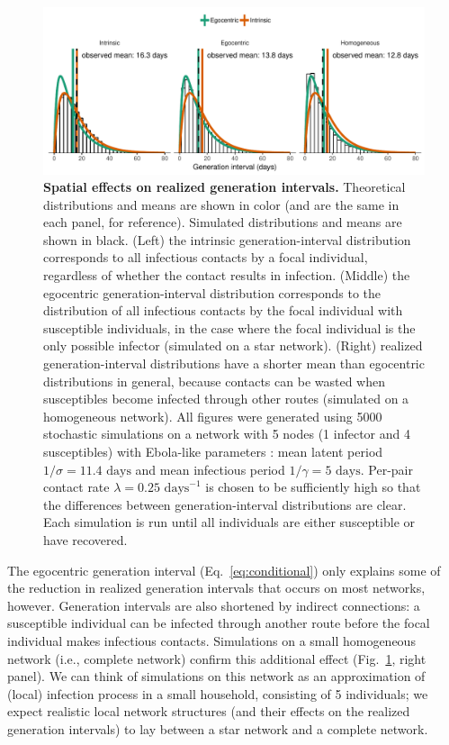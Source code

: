 \documentclass[12pt]{article}
\newcommand{\eref}[1]{Eq.~\ref{eq:#1}}
\newcommand{\fref}[1]{Fig.~\ref{fig:#1}}
\begin{document}
\begin{figure}[!ht]
\includegraphics[width=\textwidth]{../fig/local_effect.pdf}
\caption{
\textbf{Spatial effects on realized generation intervals.}
Theoretical distributions and means are shown in color (and are the same in each panel, for reference). Simulated distributions and means are shown in black.
(Left) the intrinsic generation-interval distribution corresponds to all infectious contacts by a focal individual, regardless of whether the contact results in infection.
(Middle) the egocentric generation-interval distribution corresponds to the distribution of all infectious contacts by the focal individual with susceptible individuals, in the case where the focal individual is the only possible infector (simulated on a star network).
(Right) realized generation-interval distributions have a shorter mean than egocentric distributions in general, because contacts can be wasted when susceptibles become infected through other routes (simulated on a homogeneous network).
All figures were generated using 5000 stochastic simulations on a network with 5 nodes (1 infector and 4 susceptibles) with Ebola-like parameters \citep{who2014ebola}:
mean latent period $1/\sigma = 11.4 \textrm{ days}$ and mean infectious period $1/\gamma = 5 \textrm{ days}$. 
Per-pair contact rate $\lambda = 0.25 \textrm{ days}^{-1}$ is chosen to be sufficiently high so that the differences between generation-interval distributions are clear.
Each simulation is run until all individuals are either susceptible or have recovered.
}
\label{fig:local}
\end{figure}

The egocentric generation interval (\eref{conditional}) only explains some of the reduction in realized generation intervals that occurs on most networks, however.
Generation intervals are also shortened by indirect connections: a susceptible individual can be infected through another route before the focal individual makes infectious contacts.
Simulations on a small homogeneous network (i.e., complete network) confirm this additional effect (\fref{local}, right panel). 
We can think of simulations on this network as an approximation of (local) infection process in a small household, consisting of 5 individuals;
we expect realistic local network structures (and their effects on the realized generation intervals) to lay between a star network and a complete network.
\end{document}

